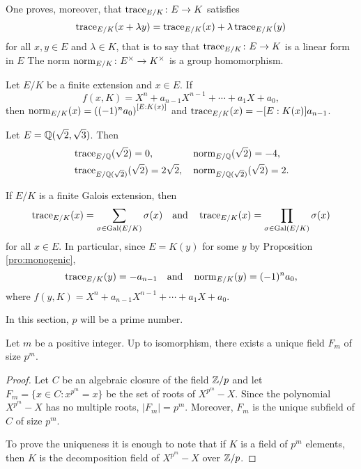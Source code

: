 One proves, moreover, that  
$\operatorname{trace}_{E/K}\colon E\to K$ 
satisfies
\[
\operatorname{trace}_{E/K}(x+\lambda y)=
\operatorname{trace}_{E/K}(x)+\lambda\operatorname{trace}_{E/K}(y)
\]
for all $x,y\in E$ and $\lambda\in K$, that is to say that 
$\operatorname{trace}_{E/K}\colon E\to K$ 
is a 
linear form in $E$ The norm  
$\operatorname{norm}_{E/K}\colon E^{\times}\to K^{\times}$ 
is a group homomorphism. 

\begin{exercise}
        Let $E/K$ be a finite extension and
        $x\in E$. If
        \[
        f(x,K)=X^n+a_{n-1}X^{n-1}+\cdots+a_1X+a_0,
        \]
        then 
        $\operatorname{norm}_{E/K}(x)=\left((-1)^na_0\right)^{[E:K(x)]}$ and 
        $\operatorname{trace}_{E/K}(x)=-[E:K(x)]a_{n-1}$. 
\end{exercise}

\begin{example}
    Let $E=\mathbb{Q}(\sqrt{2},\sqrt{3})$. Then 
    \begin{align*}
    &\operatorname{trace}_{E/\mathbb{Q}}(\sqrt{2})=0,
    &&
    \operatorname{norm}_{E/\mathbb{Q}}(\sqrt{2})=-4,\\
    &\operatorname{trace}_{E/\mathbb{Q}(\sqrt{2})}(\sqrt{2})=2\sqrt{2},
    &&\operatorname{norm}_{E/\mathbb{Q}(\sqrt{2})}(\sqrt{2})=2.    
    \end{align*}
\end{example}

\begin{example}
    If $E/K$ is a finite Galois extension, then 
    \[
    \operatorname{trace}_{E/K}(x)=\sum_{\sigma\in\operatorname{Gal}(E/K)}\sigma(x)
    \quad\text{and}\quad
    \operatorname{trace}_{E/K}(x)=\prod_{\sigma\in\operatorname{Gal}(E/K)}\sigma(x)
    \]
    for all $x\in E$. In particular, since $E=K(y)$ for some
    $y$ by Proposition \ref{pro:monogenic}, 
    \[
    \operatorname{trace}_{E/K}(y)=-a_{n-1}
    \quad\text{and}\quad
    \operatorname{norm}_{E/K}(y)=(-1)^na_0,
    \]
    where
    $f(y,K)=X^n+a_{n-1}X^{n-1}+\cdots+a_1X+a_0$.
\end{example}        


In this section, $p$ will be a prime number. 

\begin{proposition}
    Let $m$ be a positive integer. 
    Up to isomorphism, there exists a unique 
    field $F_m$ of size $p^m$. 
\end{proposition}

\begin{proof}
    Let $C$ be an algebraic closure of the field $\mathbb{Z}/p$ and 
    let $F_m=\{x\in C:x^{p^m}=x\}$ be the set of roots of $X^{p^m}-X$. Since 
    the polynomial $X^{p^m}-X$ has no multiple roots, $|F_m|=p^m$. Moreover, 
    $F_m$ is the unique subfield of $C$ of size $p^m$. 
    
    To prove the uniqueness it is enough to note that if $K$ is a field of $p^m$ elements, then
    $K$ is the decomposition field of $X^{p^m}-X$ over $\mathbb{Z}/p$.  
\end{proof}

